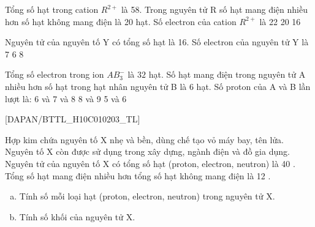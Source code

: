 \begin{ex}[2]
	Tổng số hạt trong cation $ R^{2+} $ là 58. Trong nguyên tử R số hạt mang điện nhiều hơn số hạt không mang điện là 20 hạt. Số electron của cation $ R^{2+} $ là
	\choice
	{%
	}
	{%
		22
	}
	{%
		20
	}
	{%
		16
	}
\end{ex}

\begin{ex}[2]
	Nguyên tử của nguyên tố Y có tổng số hạt là 16. Số electron của nguyên tử Y là
	\choice
	{%
		7
	}
	{%
		6
	}
	{%
	}
	{%
		8
	}
\end{ex}

\begin{ex}[3]
	Tổng số electron trong ion $ AB_{3}^{-} $ là $ 32 $ hạt. Số hạt mang điện trong nguyên tử A nhiều hơn số hạt trong hạt nhân nguyên tử B là 6 hạt. Số proton của A và B lần lượt là:
	\choice
	{%
		6 và 7
	}
	{%
	 và 8
	}
	{%
		8 và 9
	}
	{%
		5 và 6
	}
\end{ex}
[DAPAN/BTTL_H10C010203_TL]
\begin{btex}
	Hợp kim chứa nguyên tố $\mathrm{X}$ nhẹ và bền, dùng chế tạo vỏ máy bay, tên lửa. Nguyên tố $\mathrm{X}$ còn được sử dụng trong xây dựng, ngành điện và đồ gia dụng. Nguyên tử của nguyên tố $\mathrm{X}$ có tổng số hạt (proton, electron, neutron) là 40 . Tổng số hạt mang điện nhiều hơn tổng số hạt không mang điện là 12 .
\begin{enumerate}[a)]
\item Tính số mỗi loại hạt (proton, electron, neutron) trong nguyên tử $\mathrm{X}$.
\item Tính số khối của nguyên tử $\mathrm{X}$.
\end{enumerate}
\end{btex}


